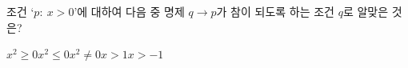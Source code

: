 조건 `$p:\ x>0$'에 대하여 다음 중 명제 $q\longrightarrow p$가 참이 되도록 하는 조건 $q$로 알맞은 것은? 
\begin{choices32}{$x^2\ge 0$}{$x^2\le 0$}{$x^2\ne 0$}{$x>1$}{$x>-1$}\end{choices32}
